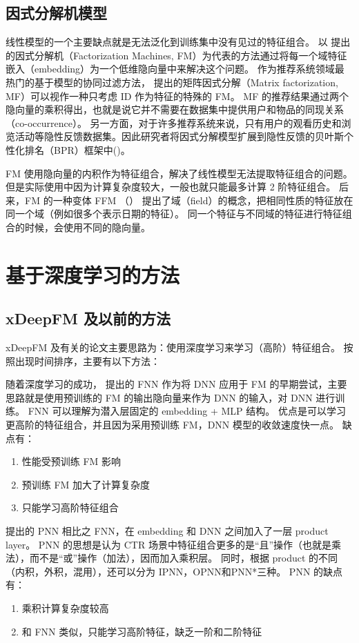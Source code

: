 \documentclass[degree=project,degree-type=project,cjk-font=noto]{thuthesis}
\begin{document}
\subsection{因式分解机模型}

线性模型的一个主要缺点就是无法泛化到训练集中没有见过的特征组合。
以 \cite{fm} 提出的因式分解机（Factorization Machines, FM）为代表的方法通过将每一个域特征嵌入（embedding）为一个低维隐向量中来解决这个问题。
作为推荐系统领域最热门的基于模型的协同过滤方法，\cite{mf} 提出的矩阵因式分解（Matrix factorization, MF）可以视作一种只考虑 ID 作为特征的特殊的 FM。
MF 的推荐结果通过两个隐向量的乘积得出，也就是说它并不需要在数据集中提供用户和物品的同现关系（co-occurrence）。
另一方面，对于许多推荐系统来说，只有用户的观看历史和浏览活动等隐性反馈数据集。因此研究者将因式分解模型扩展到隐性反馈的贝叶斯个性化排名（BPR）框架中(\cite{vbpr})。

FM 使用隐向量的内积作为特征组合，解决了线性模型无法提取特征组合的问题。
但是实际使用中因为计算复杂度较大，一般也就只能最多计算 2 阶特征组合。
后来，FM 的一种变体 FFM （\cite{ffm}） 提出了域（field）的概念，把相同性质的特征放在同一个域（例如很多个表示日期的特征）。
同一个特征与不同域的特征进行特征组合的时候，会使用不同的隐向量。

\section{基于深度学习的方法}

\subsection{xDeepFM 及以前的方法}

xDeepFM 及有关的论文主要思路为：使用深度学习来学习（高阶）特征组合。
按照出现时间排序，主要有以下方法：

随着深度学习的成功，\cite{fnn} 提出的 FNN 作为将 DNN 应用于 FM 的早期尝试，主要思路就是使用预训练的 FM 的输出隐向量来作为 DNN 的输入，对 DNN 进行训练。
FNN 可以理解为潜入层固定的 embedding + MLP 结构。
优点是可以学习更高阶的特征组合，并且因为采用预训练 FM，DNN 模型的收敛速度快一点。
缺点有：

\begin{enumerate}
  \item 性能受预训练 FM 影响
  \item 预训练 FM 加大了计算复杂度
  \item 只能学习高阶特征组合
\end{enumerate}

\cite{pnn} 提出的 PNN 相比之 FNN，在 embedding 和 DNN 之间加入了一层 product layer。
PNN 的思想是认为 CTR 场景中特征组合更多的是“且”操作（也就是乘法），而不是“或”操作（加法），因而加入乘积层。
同时，根据 product 的不同（内积，外积，混用），还可以分为 IPNN，OPNN和PNN*三种。
PNN 的缺点有：
\begin{enumerate}
  \item 乘积计算复杂度较高
  \item 和 FNN 类似，只能学习高阶特征，缺乏一阶和二阶特征
\end{enumerate}
\end{document}
